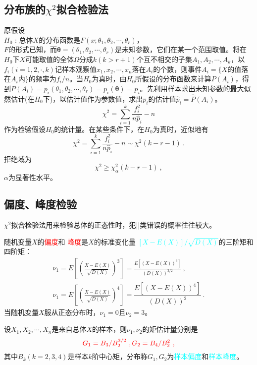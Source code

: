\documentclass[12pt,a4paper]{article}
\begin{document}
\subsection{分布族的$\chi^2$拟合检验法}
原假设\\
$H_0$ : 总体$X$的分布函数是$F(x; \theta_1, \theta_2, \cdots, \theta_r)$，\\
$F$的形式已知，而$\bm{\theta} = (\theta_1, \theta_2, \cdots, \theta_r)$是未知参数，它们在某一个范围取值。将在$H_0$下$X$可能取值的全体$\Omega$分成$k (k > r+1)$个互不相交的子集$A_1, A_2, \cdots, A_k$，以$f_i (i = 1, 2, \cdot, k)$记样本观察值$x_1, x_2, \cdots, x_n$落在$A_i$的个数，则事件$A_i = \{X$的值落在$A_i$内$\}$的频率为$f_i/n$。当$H_0$为真时，由$H_0$所假设的分布函数来计算$P(A_i)$，得到$P(A_i) = p_i(\theta_1, \theta_2, \cdots, \theta_r) = p_i(\bm{\theta} ) = p_i$。先利用样本求出未知参数的最大似然估计(在$H_0$下)，以估计值作为参数值，求出$p_i$的估计值$\hat{p}_i = \hat{P}(A_i)$。
\begin{equation}
\chi^2 = \sum_{i=1}^k \frac{f_i^2}{n \hat{p}_i} -n
\end{equation}
作为检验假设$H_0$的统计量。在某些条件下，在$H_0$为真时，近似地有
\begin{equation}
\chi^2 = \sum_{i=1}^k \frac{f_i^2}{n \hat{p}_i} -n \sim \chi^2 (k-r-1) ~.
\end{equation}
拒绝域为
\begin{equation}
\chi^2 \geqslant \chi^2_\alpha (k-r-1) ~,
\end{equation}
$\alpha$为显著性水平。

\subsection{偏度、峰度检验}
$\chi^2$拟合检验法用来检验总体的正态性时，犯||类错误的概率往往较大。

随机变量$X$的\textcolor{red}{偏度}和 \textcolor{red}{峰度}是$X$的标准变化量 \textcolor{cyan}{$[X-E(X)]/\sqrt{D(X)}$}的三阶矩和四阶矩：
\begin{eqnarray*}
\nu_1 = E\left[\left( \frac{X-E(X)}{\sqrt{D(X)} } \right)^3 \right] = \frac{E[(X-E(X))^3]}{(D(X) )^{3/2}} ~, \\
\nu_1 = E\left[\left( \frac{X-E(X)}{\sqrt{D(X)} } \right)^4 \right] = \dfrac{E[(X-E(X))^4]}{(D(X) )^{2}} ~.
\end{eqnarray*}
当随机变量$X$服从正态分布时，$\nu_1 = 0$且$\nu_2 = 3$。

设$X_1, X_2, \cdots, X_n$是来自总体$X$的样本，则$\nu_1, \nu_2$的矩估计量分别是
\begin{equation}
\color{red} G_1 = B_3/B_2^{3/2} ~, G_2 = B_4/B_2^2 ~,
\end{equation}
其中$B_k (k = 2, 3, 4)$是样本$k$阶中心矩，分布称$G_1, G_2$为\textcolor{cyan}{样本偏度}和\textcolor{cyan}{样本峰度}。
\end{document}
